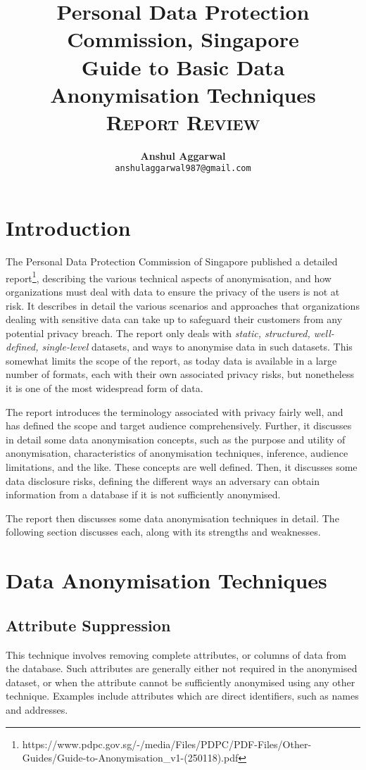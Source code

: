 \documentclass[11pt, a4paper]{article}
\title{\normalsize{Personal Data Protection Commission, Singapore}\\\LARGE{Guide to Basic Data Anonymisation Techniques}\\\vspace{0.3cm}\Large{{\textsc{Report Review}}}}
\author{\textbf{Anshul Aggarwal}\\\texttt{anshulaggarwal987@gmail.com}}
\date{}
\begin{document}
\maketitle

\section{Introduction}
The Personal Data Protection Commission of Singapore published a detailed report\footnote{https://www.pdpc.gov.sg/-/media/Files/PDPC/PDF-Files/Other-Guides/Guide-to-Anonymisation\_v1-(250118).pdf}, describing the various technical aspects of anonymisation, and how organizations must deal with data to ensure the privacy of the users is not at risk. It describes in detail the various scenarios and approaches that organizations dealing with sensitive data can take up to safeguard their customers from any potential privacy breach. The report only deals with \textit{static, structured, well-defined, single-level} datasets, and ways to anonymise data in such datasets. This somewhat limits the scope of the report, as today data is available in a large number of formats, each with their own associated privacy risks, but nonetheless it is one of the most widespread form of data.


The report introduces the terminology associated with privacy fairly well, and has defined the scope and target audience comprehensively. Further, it discusses in detail some data anonymisation concepts, such as the purpose and utility of anonymisation, characteristics of anonymisation techniques, inference, audience limitations, and the like. These concepts are well defined. Then, it discusses some data disclosure risks, defining the different ways an adversary can obtain information from a database if it is not sufficiently anonymised.

The report then discusses some data anonymisation techniques in detail. The following section discusses each, along with its strengths and weaknesses.

\section{Data Anonymisation Techniques}

\subsection{Attribute Suppression}

This technique involves removing complete attributes, or columns of data from the database. Such attributes are generally either not required in the anonymised dataset, or when the attribute cannot be sufficiently anonymised using any other technique. Examples include attributes which are direct identifiers, such as names and addresses.
\end{document}
